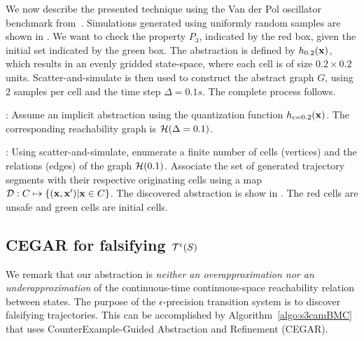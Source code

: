 We now describe the presented technique using the Van der Pol
oscillator benchmark from~\cite{zutshi2014multiple}. Simulations
generated using uniformly random samples are shown in
. We want to check the property $P_3$, indicated by
the red box, given the initial set indicated by the green box. The
abstraction is defined by $h_{0.2}(\mathbf{x})$, which results in an
evenly gridded state-space, where each cell is of size $0.2 \times
0.2$ units.  Scatter-and-simulate is then used to construct the
abstract graph $G$, using $2$ samples per cell and the time step
$\Delta = 0.1s$. The complete process follows.

: Assume an implicit abstraction using the quantization
        function $h_{\epsilon=0.2}(\mathbf{x})$. The corresponding reachability
    graph is $\mathcal{H}(\Delta=0.1)$.

: Using scatter-and-simulate, enumerate a finite number
    of cells (vertices) and the relations (edges) of the graph
    $\mathcal{H}(0.1)$. Associate the set of generated trajectory
    segments with their respective originating cells using a map $\mathcal{D}:C
        \mapsto \{(\mathbf{x},\mathbf{x}') |\mathbf{x} \in C\}$. The discovered
    abstraction is show in . The red cells
    are unsafe and green cells are initial cells.


\subsection{CEGAR for falsifying $\mathcal{T}^{\epsilon}(S)$}

We remark that our abstraction is {\em neither an overapproximation
nor an underapproximation} of the continuous-time continuous-space
reachability relation between states. The purpose of the
$\epsilon$-precision transition system is to discover falsifying
trajectories. This can be accomplished by
Algorithm~\ref{algo:s3camBMC} that uses CounterExample-Guided
Abstraction and Refinement (CEGAR).

